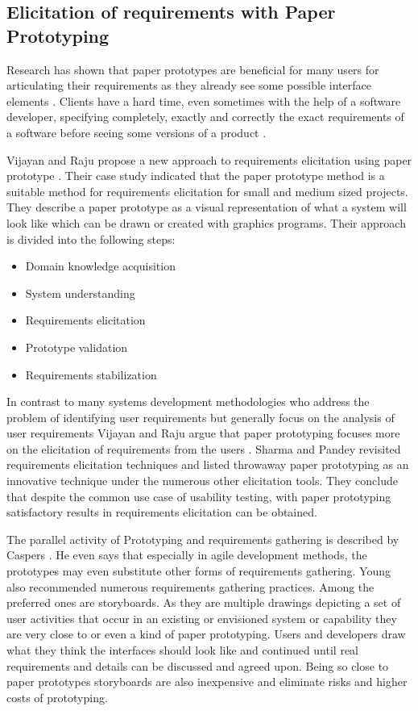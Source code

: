 \subsection{Elicitation of requirements with Paper Prototyping}
\label{section:paperprototyping}
 
 Research has shown that paper prototypes are beneficial for many users for articulating their requirements as they already see some possible interface elements \cite{vijayan2011new}. Clients have a hard time, even sometimes with the help of a software developer, specifying completely, exactly and correctly the exact requirements of a software before seeing some versions of a product \cite{hickey1998prototyping}.

Vijayan and Raju propose a new approach to requirements elicitation using paper prototype \cite{vijayan2011new}. Their case study indicated that the paper prototype method is a suitable method for requirements elicitation for small and medium sized projects. They describe a paper prototype as a visual representation of what a system will look like which can be drawn or created with graphics programs. Their approach is divided into the following steps:
\begin{itemize}
	\item Domain knowledge acquisition
	\item System understanding
	\item Requirements elicitation
	\item Prototype validation
	\item Requirements stabilization
\end{itemize}

In contrast to many systems development methodologies who address the problem of identifying user requirements but generally focus on the analysis of user requirements Vijayan and Raju argue that paper prototyping focuses more on the elicitation of requirements from the users \cite{vijayan2011new}. Sharma and Pandey \cite{sharma2013revisiting} revisited requirements elicitation techniques and listed throwaway paper prototyping as an innovative technique under the numerous other elicitation tools. They conclude that despite the common use case of usability testing, with paper prototyping satisfactory results in requirements elicitation can be obtained.

The parallel activity of Prototyping and requirements gathering is described by Caspers \cite{jones1998estimating}. He even says that especially in agile development methods, the prototypes may even substitute other forms of requirements gathering. Young \cite{young2002recommended} also recommended numerous requirements gathering practices. Among the preferred ones are storyboards. As they are multiple drawings depicting a set of user activities that occur in an existing or envisioned system or capability they are very close to or even a kind of paper prototyping. Users and developers draw what they think the interfaces should look like and continued until real requirements and details can be discussed and agreed upon. Being so close to paper prototypes storyboards are also inexpensive and eliminate risks and higher costs of prototyping.

